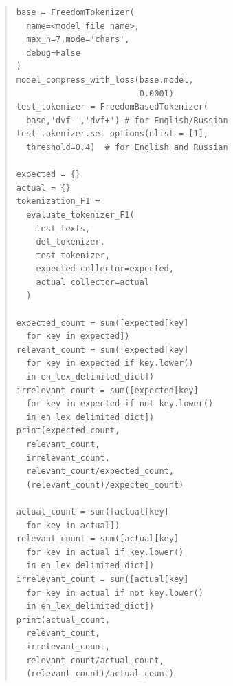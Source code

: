 \documentclass[11pt]{article}
\begin{document}
\begin{quote}\begin{small}
\begin{verbatim}
base = FreedomTokenizer(
  name=<model file name>,
  max_n=7,mode='chars',
  debug=False
)
model_compress_with_loss(base.model,
                         0.0001) 
test_tokenizer = FreedomBasedTokenizer(
  base,'dvf-','dvf+') # for English/Russian
test_tokenizer.set_options(nlist = [1], 
  threshold=0.4)  # for English and Russian

expected = {}
actual = {}
tokenization_F1 = 
  evaluate_tokenizer_F1(
    test_texts,
    del_tokenizer,
    test_tokenizer,
    expected_collector=expected,
    actual_collector=actual
  )

expected_count = sum([expected[key] 
  for key in expected])
relevant_count = sum([expected[key] 
  for key in expected if key.lower() 
  in en_lex_delimited_dict])
irrelevant_count = sum([expected[key] 
  for key in expected if not key.lower() 
  in en_lex_delimited_dict])
print(expected_count,
  relevant_count,
  irrelevant_count,
  relevant_count/expected_count,
  (relevant_count)/expected_count)

actual_count = sum([actual[key] 
  for key in actual])
relevant_count = sum([actual[key] 
  for key in actual if key.lower() 
  in en_lex_delimited_dict])
irrelevant_count = sum([actual[key] 
  for key in actual if not key.lower() 
  in en_lex_delimited_dict])
print(actual_count,
  relevant_count,
  irrelevant_count,
  relevant_count/actual_count,
  (relevant_count)/actual_count)
\end{verbatim}
\end{small}\end{quote}
\end{document}
